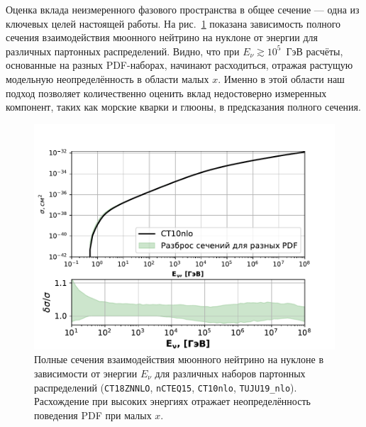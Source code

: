Оценка вклада неизмеренного фазового пространства в общее сечение — одна из ключевых целей настоящей работы. На рис.~\ref{fig:xsec_total} показана зависимость полного сечения взаимодействия мюонного нейтрино на нуклоне от энергии для различных партонных распределений. Видно, что при $E_\nu \gtrsim 10^5$~ГэВ расчёты, основанные на разных PDF-наборах, начинают расходиться, отражая растущую модельную неопределённость в области малых $x$. Именно в этой области наш подход позволяет количественно оценить вклад недостоверно измеренных компонент, таких как морские кварки и глюоны, в предсказания полного сечения.


\begin{figure}[!h]
\centering
\includegraphics[width=\linewidth]{images/NuProp/xs_vs_enu.pdf}
\caption{Полные сечения взаимодействия мюонного нейтрино на нуклоне в зависимости от энергии $E_\nu$ для различных наборов партонных распределений (\texttt{CT18ZNNLO}, \texttt{nCTEQ15}, \texttt{CT10nlo}, \texttt{TUJU19_nlo}). Расхождение при высоких энергиях отражает неопределённость поведения PDF при малых $x$.} 
\label{fig:xsec_total}
\end{figure}
